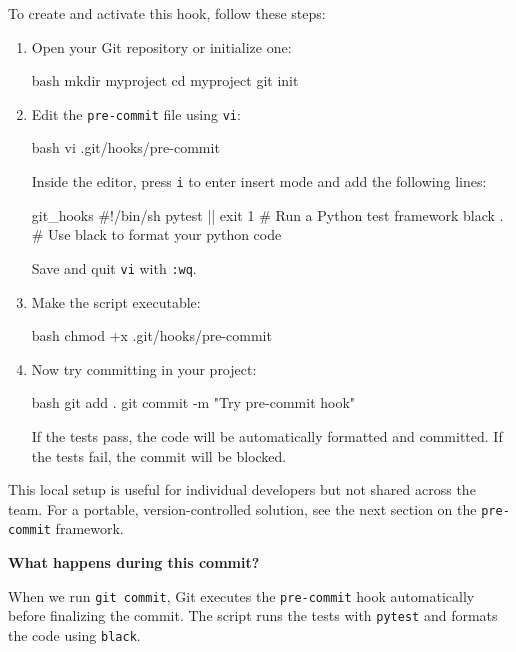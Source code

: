 To create and activate this hook, follow these steps:

\begin{enumerate}
  \item Open your Git repository or initialize one:
\begin{codeonly}{bash}
mkdir myproject
cd myproject
git init
\end{codeonly}

  \item Edit the \texttt{pre-commit} file using \texttt{vi}:
\begin{codeonly}{bash}
vi .git/hooks/pre-commit
\end{codeonly}

  Inside the editor, press \texttt{i} to enter insert mode and add the following lines:

\begin{codeonly}{git\_hooks}
#!/bin/sh
pytest || exit 1 # Run a Python test framework
black .          # Use black to format your python code
\end{codeonly}

  Save and quit \texttt{vi} with \texttt{:wq}.

  \item Make the script executable:
\begin{codeonly}{bash}
chmod +x .git/hooks/pre-commit
\end{codeonly}

  \item Now try committing in your project:
\begin{codeonly}{bash}
git add .
git commit -m "Try pre-commit hook"
\end{codeonly}

If the tests pass, the code will be automatically formatted and committed. If the tests fail, the commit will be blocked.
\end{enumerate}

This local setup is useful for individual developers but not shared across the team. For a portable, version-controlled solution, see the next section on the \texttt{pre-commit} framework.

%
\textbf{What happens during this commit?}

When we run \texttt{git commit}, Git executes the \texttt{pre-commit} hook automatically before finalizing the commit. The script runs the tests with \texttt{pytest} and formats the code using \texttt{black}.

